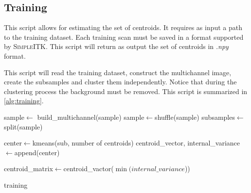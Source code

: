 \documentclass{standalone}
\begin{document}
	\subsection{Training}
	This script allows for estimating the set of centroids. It requires as input a path to the training dataset. Each training scan must be saved in a format supported by \textsc{SimpleITK}. This script will return as output the set of centroids in \textit{.npy} format.

	This script will read the training dataset, construct the multichannel image, create the subsamples and cluster them independently. Notice that during the clustering process the background must be removed. This script is summarized in \ref{alg:training}.
	
	
		\begin{algorithm}[h!]
		
		\SetAlgoLined
		\DontPrintSemicolon
		
		\;
		
		\;
		sample$\leftarrow$ build\_multichannel(sample)\;
		sample$\leftarrow$shuffle(sample)\;
		subsamples$\leftarrow$split(sample)\;
		
		{
			center$\leftarrow$kmeans(sub, number of centroids)\;
			centroid\_vector, internal\_variance$\leftarrow$append(center)
			
		}\;
		
		centroid\_matrix$\leftarrow$centroid\_vactor($\min(internal\_variance$))\;
		
		\caption{training}\label{alg:training}
		
	\end{algorithm}
\end{document}
